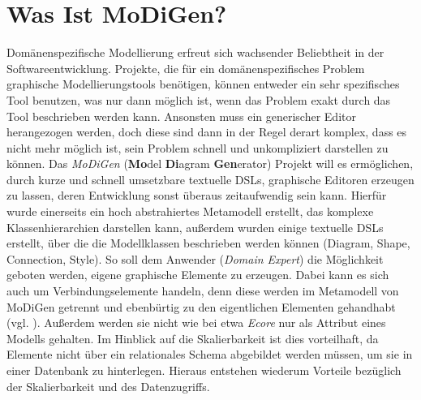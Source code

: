 \section{Was Ist MoDiGen?}\label{modigen}
Domänenspezifische Modellierung erfreut sich wachsender Beliebtheit in der Softwareentwicklung. Projekte, die für ein domänenspezifisches Problem graphische Modellierungstools benötigen, können entweder ein sehr spezifisches Tool benutzen, was nur dann möglich ist, wenn das Problem exakt durch das Tool beschrieben werden kann. Ansonsten muss ein generischer Editor herangezogen werden, doch diese sind dann in der Regel derart komplex, dass es nicht mehr möglich ist, sein Problem schnell und unkompliziert darstellen zu können. Das \textit{MoDiGen} (\textbf{Mo}del \textbf{Di}agram \textbf{Gen}erator) Projekt will es ermöglichen, durch kurze und schnell umsetzbare textuelle DSLs, graphische Editoren erzeugen zu lassen, deren Entwicklung sonst überaus zeitaufwendig sein kann. Hierfür wurde einerseits ein hoch abstrahiertes Metamodell erstellt, das komplexe Klassenhierarchien darstellen kann, außerdem wurden einige textuelle DSLs erstellt, über die die Modellklassen beschrieben werden können (Diagram, Shape, Connection, Style). So soll dem Anwender (\textit{Domain Expert}) die Möglichkeit geboten werden, eigene graphische Elemente zu erzeugen. Dabei kann es sich auch um Verbindungselemente handeln, denn diese werden im Metamodell von MoDiGen getrennt und ebenbürtig zu den eigentlichen Elementen gehandhabt (vgl. ). Außerdem werden sie nicht wie bei etwa \textit{Ecore} nur als Attribut eines Modells gehalten. Im Hinblick auf die Skalierbarkeit ist dies vorteilhaft, da Elemente nicht über ein relationales Schema abgebildet werden müssen, um sie in einer Datenbank zu hinterlegen. Hieraus entstehen wiederum Vorteile bezüglich der Skalierbarkeit und des Datenzugriffs.
